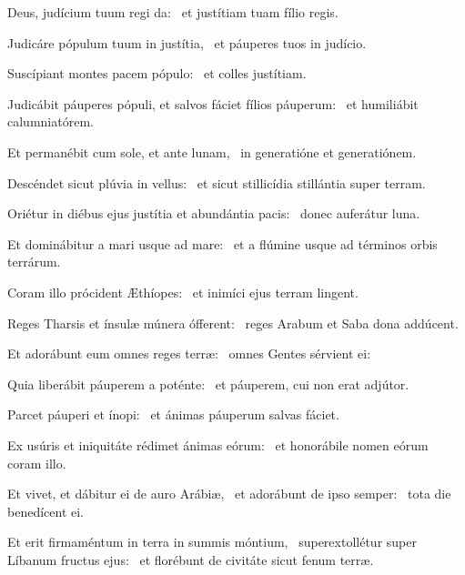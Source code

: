 \item Deus, judícium tuum regi da:~\psstar{} et justítiam tuam fílio regis.

\item Judicáre pópulum tuum in justítia,~\psstar{} et páuperes tuos in judício.

\item Suscípiant montes pacem pópulo:~\psstar{} et colles justítiam.

\item Judicábit páuperes pópuli, et salvos fáciet fílios páuperum:~\psstar{} et humiliábit calumniatórem.

\item Et permanébit cum sole, et ante lunam,~\psstar{} in generatióne et generatiónem.

\item Descéndet sicut plúvia in vellus:~\psstar{} et sicut stillicídia stillántia super terram.

\item Oriétur in diébus ejus justítia et abundántia pacis:~\psstar{} donec auferátur luna.

\item Et dominábitur a mari usque ad mare:~\psstar{} et a flúmine usque ad términos orbis terrárum.

\item Coram illo prócident Æthíopes:~\psstar{} et inimíci ejus terram lingent.

\item Reges Tharsis et ínsulæ múnera ófferent:~\psstar{} reges Arabum et Saba dona addúcent.

\item Et adorábunt eum omnes reges terræ:~\psstar{} omnes Gentes sérvient ei:

\item Quia liberábit páuperem a poténte:~\psstar{} et páuperem, cui non erat adjútor.

\item Parcet páuperi et ínopi:~\psstar{} et ánimas páuperum salvas fáciet.

\item Ex usúris et iniquitáte rédimet ánimas eórum:~\psstar{} et honorábile nomen eórum coram illo.

\item Et vivet, et dábitur ei de auro Arábiæ,~\pscross{} et adorábunt de ipso semper:~\psstar{} tota die benedícent ei.

\item Et erit firmaméntum in terra in summis móntium,~\pscross{} superextollétur super Líbanum fructus ejus:~\psstar{} et florébunt de civitáte sicut fenum terræ.


